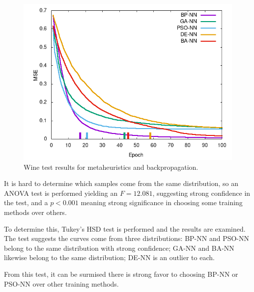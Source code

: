 \documentclass[a4paper,12pt]{article}
\begin{document}
\begin{figure}[h!]
\centering
\includegraphics[scale=0.60]{images/wine-plot.png}
\caption{Wine test results for metaheuristics and backpropagation.}
\label{fig:wine}
\end{figure}

It is hard to determine which samples come from the same distribution, so an ANOVA test is performed yielding an $F = 12.081$, suggesting strong confidence in the test, and a $p < 0.001$ meaning strong significance in choosing some training methods over others.

To determine this, Tukey's HSD test is performed and the results are examined. The test suggests the curves come from three distributions: BP-NN and PSO-NN belong to the same distribution with strong confidence; GA-NN and BA-NN likewise belong to the same distribution; DE-NN is an outlier to each.

From this test, it can be surmised there is strong favor to choosing BP-NN or PSO-NN over other training methods.

\begin{table}[h!]
\centering
{}
\caption{Minimum and average time to terminate for Wine data set.}
\label{Tab:wine-min}
\end{table}
\end{document}
